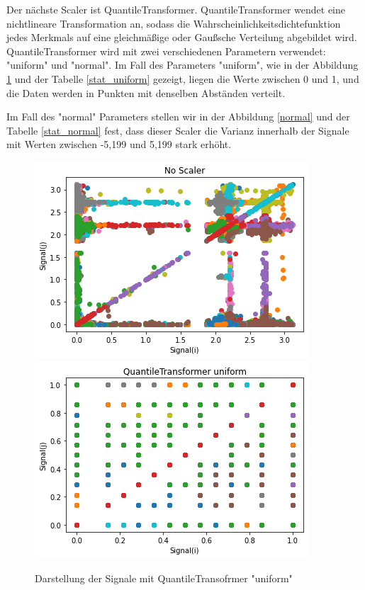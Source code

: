 \documentclass[12pt,a4paper]{scrartcl}
\numberwithin{equation}{section}
\begin{document}
Der nächste Scaler ist QuantileTransformer. QuantileTransformer wendet eine nichtlineare Transformation an, sodass die Wahrscheinlichkeitsdichtefunktion jedes Merkmals auf eine gleichmäßige oder Gaußsche Verteilung abgebildet wird. QuantileTransformer wird mit zwei verschiedenen Parametern verwendet: "uniform" und "normal". Im Fall des Parameters "uniform", wie in der Abbildung \ref{uniform} und der Tabelle \ref{stat_uniform} gezeigt, liegen die Werte zwischen 0 und 1, und die Daten werden in Punkten mit denselben Abständen verteilt.

Im Fall des "normal" Parameters stellen wir in der Abbildung \ref{normal} und der Tabelle \ref{stat_normal} fest, dass dieser Scaler die Varianz innerhalb der Signale mit Werten zwischen -5,199 und 5,199 stark erhöht. 

\begin{figure}[ht!]
	\centering
	  \includegraphics[scale=0.5]{noScaler.png}
	  \includegraphics[scale=0.5]{QuantileTransformer_uniform.png}
	  \caption{Darstellung der Signale mit QuantileTransofrmer "uniform"}
	\label{uniform}
\end{figure}
\end{document}
